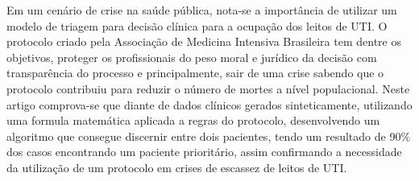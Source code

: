 \documentclass[12pt]{article}
\begin{document}
Em um cenário de crise na saúde pública, nota-se a importância de utilizar um modelo de triagem para decisão clínica para a ocupação dos leitos de UTI. O protocolo criado pela Associação de Medicina Intensiva Brasileira tem dentre os objetivos, proteger os profissionais do peso moral e jurídico da decisão com transparência do processo e principalmente, sair de uma crise sabendo que o protocolo contribuiu para reduzir o número de mortes a nível populacional. Neste artigo comprova-se que diante de dados clínicos gerados sinteticamente, utilizando uma formula matemática aplicada a regras do protocolo, desenvolvendo um algoritmo que consegue discernir entre dois pacientes, tendo um resultado de 90\% dos casos encontrando um paciente prioritário, assim confirmando a necessidade da utilização de um protocolo em crises de escassez de leitos de UTI.



\end{document}
